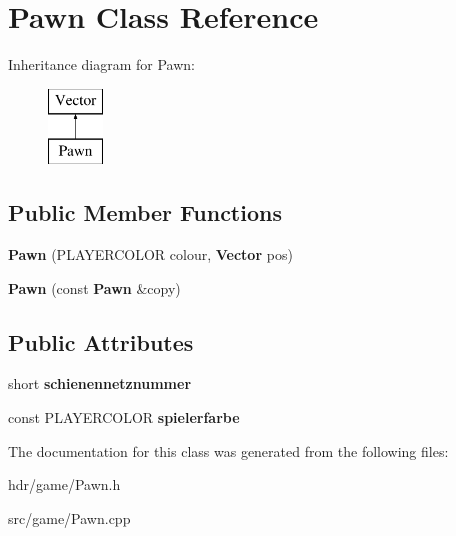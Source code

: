 \section{Pawn Class Reference}
\label{class_pawn}
Inheritance diagram for Pawn\-:\begin{figure}[H]
\begin{center}
\leavevmode
\includegraphics[height=2.000000cm]{class_pawn}
\end{center}
\end{figure}
\subsection*{Public Member Functions}
\begin{DoxyCompactItemize}
\item 
{\bfseries Pawn} (P\-L\-A\-Y\-E\-R\-C\-O\-L\-O\-R colour, {\bf Vector} pos)\label{class_pawn_a0edb7824a9ebc6d83f3836ed66c769f5}

\item 
{\bfseries Pawn} (const {\bf Pawn} \&copy)\label{class_pawn_a512724e66a28f71702973bcd87bd883b}

\end{DoxyCompactItemize}
\subsection*{Public Attributes}
\begin{DoxyCompactItemize}
\item 
short {\bfseries schienennetznummer}\label{class_pawn_a8f02932d671c756305cbe3959104d5bf}

\item 
const P\-L\-A\-Y\-E\-R\-C\-O\-L\-O\-R {\bfseries spielerfarbe}\label{class_pawn_a5e5204e3877b774744df1b5aeca2fb92}

\end{DoxyCompactItemize}


The documentation for this class was generated from the following files\-:\begin{DoxyCompactItemize}
\item 
hdr/game/Pawn.\-h\item 
src/game/Pawn.\-cpp\end{DoxyCompactItemize}
